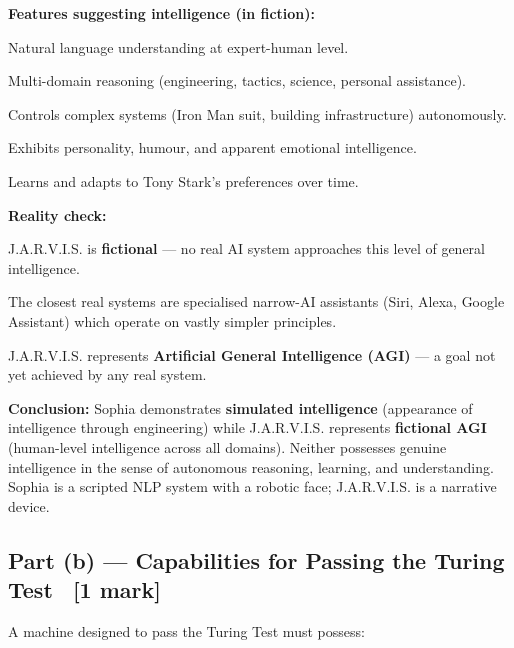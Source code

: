 \documentclass[12pt, a4paper]{article}
\newenvironment{answerbox}{\begin{mdframed}[style=answerframe]}{\end{mdframed}}
\begin{document}
\noindent\textbf{Features suggesting intelligence (in fiction):}
\begin{keypoints}
  \item Natural language understanding at expert-human level.
  \item Multi-domain reasoning (engineering, tactics, science, personal assistance).
  \item Controls complex systems (Iron Man suit, building infrastructure) autonomously.
  \item Exhibits personality, humour, and apparent emotional intelligence.
  \item Learns and adapts to Tony Stark's preferences over time.
\end{keypoints}

\noindent\textbf{Reality check:}
\begin{keypoints}
  \item J.A.R.V.I.S. is \textbf{fictional} — no real AI system approaches this level of general intelligence.
  \item The closest real systems are specialised narrow-AI assistants (Siri, Alexa, Google Assistant) which operate on vastly simpler principles.
  \item J.A.R.V.I.S. represents \textbf{Artificial General Intelligence (AGI)} — a goal not yet achieved by any real system.
\end{keypoints}

\begin{answerbox}
\textbf{Conclusion:} Sophia demonstrates \textbf{simulated intelligence} (appearance of intelligence through engineering) while J.A.R.V.I.S. represents \textbf{fictional AGI} (human-level intelligence across all domains). Neither possesses genuine intelligence in the sense of autonomous reasoning, learning, and understanding. Sophia is a scripted NLP system with a robotic face; J.A.R.V.I.S. is a narrative device.
\end{answerbox}

\subsection{Part (b) — Capabilities for Passing the Turing Test \ [1 mark]}

\noindent A machine designed to pass the Turing Test must possess:
\end{document}
